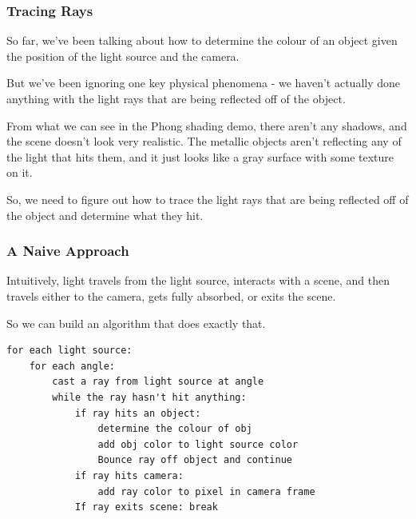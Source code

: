 \documentclass[12pt]{beamer}
\begin{document}


  \begin{frame}
    \frametitle{Tracing Rays}

    So far, we've been talking about how to determine the colour of an object given the position of the light source and the camera.

    But we've been ignoring one key physical phenomena - we haven't actually done anything with the light rays that are being reflected off of the object.

    From what we can see in the Phong shading demo, there aren't any shadows, and the scene doesn't look very realistic.
    The metallic objects aren't reflecting any of the light that hits them, and it just looks like a gray surface with some texture on it.

    So, we need to figure out how to trace the light rays that are being reflected off of the object and determine what they hit.

  \end{frame}

  \begin{frame}
    \frametitle{A Naive Approach}

    Intuitively, light travels from the light source, interacts with a scene, and then travels either to the camera, gets fully absorbed, or exits the scene.

    So we can build an algorithm that does exactly that.

  \end{frame}

  \begin{frame}[fragile]

    \footnotesize            \begin{lstlisting}[label={lst:pseudocode-raytrace}]
for each light source:
    for each angle:
        cast a ray from light source at angle
        while the ray hasn't hit anything:
            if ray hits an object:
                determine the colour of obj
                add obj color to light source color
                Bounce ray off object and continue
            if ray hits camera:
                add ray color to pixel in camera frame
            If ray exits scene: break
    \end{lstlisting}

  \end{frame}
\end{document}
